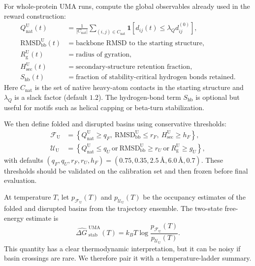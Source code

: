 \documentclass[11pt]{article}
\newcommand{\angstrom}{\ensuremath{\text{\AA}}}
\newcommand{\dG}{\ensuremath{\Delta G \ }}
\begin{document}
	For whole-protein UMA runs, compute the global observables already used in the reward construction:
	\begin{align}
		Q_{\mathrm{nat}}^{\mathrm U}(t) &= \frac{1}{|C_{\mathrm{nat}}|}\sum_{(i,j)\in C_{\mathrm{nat}}}\mathbf{1}\!\left[d_{ij}(t)\leq \lambda_Q d_{ij}^{(0)}\right],\\
		\mathrm{RMSD}_{\mathrm{bb}}^{\mathrm U}(t) &= \text{backbone RMSD to the starting structure},\\
		R_{\mathrm g}^{\mathrm U}(t) &= \text{radius of gyration},\\
		H_{\mathrm{sec}}^{\mathrm U}(t) &= \text{secondary-structure retention fraction},\\
		S_{\mathrm{hb}}(t) &= \text{fraction of stability-critical hydrogen bonds retained}.
	\end{align}
	Here $C_{\mathrm{nat}}$ is the set of native heavy-atom contacts in the starting structure and $\lambda_Q$ is a slack factor (default $1.2$). The hydrogen-bond term $S_{\mathrm{hb}}$ is optional but useful for motifs such as helical capping or beta-turn stabilization.
	
	We then define folded and disrupted basins using conservative thresholds:
	\begin{align}
		\mathcal{F}_{\mathrm U} &= \left\{Q_{\mathrm{nat}}^{\mathrm U}\geq q_F,\ \mathrm{RMSD}_{\mathrm{bb}}^{\mathrm U}\leq r_F,\ H_{\mathrm{sec}}^{\mathrm U}\geq h_F\right\},\\
		\mathcal{U}_{\mathrm U} &= \left\{Q_{\mathrm{nat}}^{\mathrm U}\leq q_U\ \text{or}\ \mathrm{RMSD}_{\mathrm{bb}}^{\mathrm U}\geq r_U\ \text{or}\ R_{\mathrm g}^{\mathrm U}\geq g_U\right\},
	\end{align}
	with defaults $(q_F,q_U,r_F,r_U,h_F)=(0.75,0.35,2.5\,\angstrom,6.0\,\angstrom,0.7)$. These thresholds should be validated on the calibration set and then frozen before final evaluation.
	
	At temperature $T$, let $p_{\mathcal F_{\mathrm U}}(T)$ and $p_{\mathcal U_{\mathrm U}}(T)$ be the occupancy estimates of the folded and disrupted basins from the trajectory ensemble. The two-state free-energy estimate is
	\begin{equation}
		\label{eq:twostateg}
		\widehat{\dG}^{\mathrm{UMA}}_{\mathrm{stab}}(T)=k_B T \log\frac{p_{\mathcal{F}_{\mathrm U}}(T)}{p_{\mathcal{U}_{\mathrm U}}(T)}.
	\end{equation}
	This quantity has a clear thermodynamic interpretation, but it can be noisy if basin crossings are rare. We therefore pair it with a temperature-ladder summary.
	
\end{document}
